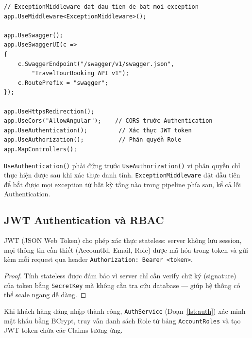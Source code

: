\begin{lstlisting}[style=csharp,
  caption={Middleware Pipeline trong Program.cs},
  label={lst:pipeline}]
// ExceptionMiddleware dat dau tien de bat moi exception
app.UseMiddleware<ExceptionMiddleware>();

app.UseSwagger();
app.UseSwaggerUI(c =>
{
    c.SwaggerEndpoint("/swagger/v1/swagger.json",
        "TravelTourBooking API v1");
    c.RoutePrefix = "swagger";
});

app.UseHttpsRedirection();
app.UseCors("AllowAngular");    // CORS trước Authentication
app.UseAuthentication();         // Xác thực JWT token
app.UseAuthorization();          // Phân quyền Role
app.MapControllers();
\end{lstlisting}

\begin{cor}
\texttt{UseAuthentication()} phải đứng trước
\texttt{UseAuthorization()} vì phân quyền chỉ thực hiện được
sau khi xác thực danh tính. \texttt{ExceptionMiddleware} đặt
đầu tiên để bắt được mọi exception từ bất kỳ tầng nào trong
pipeline phía sau, kể cả lỗi Authentication.
\end{cor}

\subsection{JWT Authentication và RBAC}\label{sub3.2.3}

\begin{thm}\label{thm3.2}
JWT (JSON Web Token) cho phép xác thực stateless: server không
lưu session, mọi thông tin cần thiết (AccountId, Email, Role)
được mã hóa trong token và gửi kèm mỗi request qua header
\texttt{Authorization: Bearer <token>}.
\end{thm}

\noindent\begin{proof}
Tính stateless được đảm bảo vì server chỉ cần verify chữ ký
(signature) của token bằng \texttt{SecretKey} mà không cần
tra cứu database — giúp hệ thống có thể scale ngang dễ dàng.
\QEDAa
\end{proof}

Khi khách hàng đăng nhập thành công, \texttt{AuthService}
(Đoạn~\ref{lst:auth}) xác minh mật khẩu bằng BCrypt, truy
vấn danh sách Role từ bảng \texttt{AccountRoles} và tạo JWT
token chứa các Claims tương ứng.

